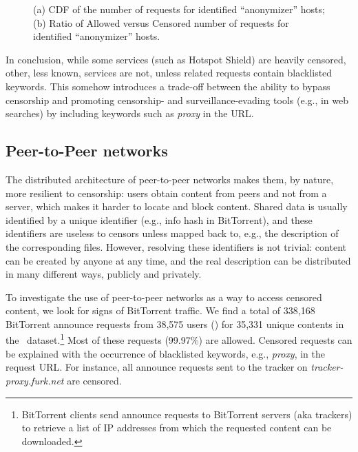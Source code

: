 \documentclass{sig-alternate-2013}
\newcommand{\red}[1] {{\color{black}{#1}}}
\def\df{\xspace}
\begin{document}
\begin{figure}[t!]
  \begin{center}
        \vspace*{-0.2cm}
        \caption{(a) CDF of the number of requests for identified ``anonymizer'' hosts; (b) Ratio of Allowed versus Censored number of requests for identified ``anonymizer'' hosts.}
	\end{center}
\vspace*{-0.2cm}
\end{figure}


In conclusion, while some services (such as Hotspot Shield) are  heavily censored, other, less known, services are not, unless related requests contain blacklisted keywords. This somehow introduces a trade-off between 
the ability to bypass censorship and promoting censorship- and surveillance-evading tools (e.g., in web searches) by including keywords such as {\em proxy} in the URL.











\subsection{Peer-to-Peer networks}

The distributed architecture of peer-to-peer networks makes them, by nature, more resilient to censorship: users obtain content from peers and not from a server, which makes it harder to locate and block content. Shared data is usually identified by a unique identifier (e.g., info hash in BitTorrent), and these identifiers are useless to censors unless mapped back to, e.g., the description of the corresponding files. However, resolving these identifiers is not trivial: content can be created by anyone at any time, and the real description can be distributed in many different ways, publicly and privately. 

To investigate the use of peer-to-peer networks as a way to access censored content, we look for signs of BitTorrent traffic. We find a total of 338,168 BitTorrent announce requests from 38,575 users (\red{BitTorrent uses a 20-byte peer\_id field to identify peers, which we use to count unique users}) for 35,331 unique contents in the \df\ dataset.\footnote{BitTorrent clients send announce requests to BitTorrent servers (aka trackers) to retrieve a list of IP addresses from which the requested content can be downloaded.} Most of these requests (99.97\%) are allowed. Censored requests can be explained with the occurrence of blacklisted keywords, e.g., {\em proxy}, in the request URL. For instance, all announce requests sent to the tracker on \emph{tracker-proxy.furk.net} are censored. 
\end{document}
